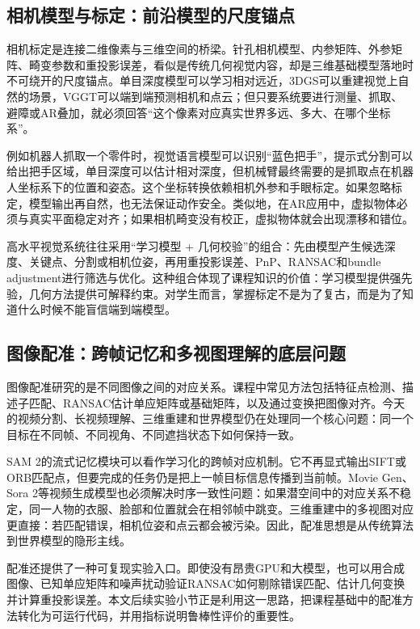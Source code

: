 \documentclass[UTF8,a4paper,12pt]{ctexart}
\newcommand{\model}[1]{\textsf{#1}}
\begin{document}
\subsection{相机模型与标定：前沿模型的尺度锚点}
相机标定是连接二维像素与三维空间的桥梁。针孔相机模型、内参矩阵、外参矩阵、畸变参数和重投影误差，看似是传统几何视觉内容，却是三维基础模型落地时不可绕开的尺度锚点。单目深度模型可以学习相对远近，3DGS可以重建视觉上自然的场景，VGGT可以端到端预测相机和点云；但只要系统要进行测量、抓取、避障或AR叠加，就必须回答“这个像素对应真实世界多远、多大、在哪个坐标系”。

例如机器人抓取一个零件时，视觉语言模型可以识别“蓝色把手”，提示式分割可以给出把手区域，单目深度可以估计相对深度，但机械臂最终需要的是抓取点在机器人坐标系下的位置和姿态。这个坐标转换依赖相机外参和手眼标定。如果忽略标定，模型输出再自然，也无法保证动作安全。类似地，在AR应用中，虚拟物体必须与真实平面稳定对齐；如果相机畸变没有校正，虚拟物体就会出现漂移和错位。

高水平视觉系统往往采用“学习模型 + 几何校验”的组合：先由模型产生候选深度、关键点、分割或相机位姿，再用重投影误差、PnP、RANSAC和bundle adjustment进行筛选与优化。这种组合体现了课程知识的价值：学习模型提供强先验，几何方法提供可解释约束。对学生而言，掌握标定不是为了复古，而是为了知道什么时候不能盲信端到端模型。

\subsection{图像配准：跨帧记忆和多视图理解的底层问题}
图像配准研究的是不同图像之间的对应关系。课程中常见方法包括特征点检测、描述子匹配、RANSAC估计单应矩阵或基础矩阵，以及通过变换把图像对齐。今天的视频分割、长视频理解、三维重建和世界模型仍在处理同一个核心问题：同一个目标在不同帧、不同视角、不同遮挡状态下如何保持一致。

\model{SAM 2}的流式记忆模块可以看作学习化的跨帧对应机制。它不再显式输出SIFT或ORB匹配点，但要完成的任务仍是把上一帧目标信息传播到当前帧。\model{Movie Gen}、\model{Sora 2}等视频生成模型也必须解决时序一致性问题：如果潜空间中的对应关系不稳定，同一人物的衣服、脸部和位置就会在相邻帧中跳变。三维重建中的多视图对应更直接：若匹配错误，相机位姿和点云都会被污染。因此，配准思想是从传统算法到世界模型的隐形主线。

配准还提供了一种可复现实验入口。即使没有昂贵GPU和大模型，也可以用合成图像、已知单应矩阵和噪声扰动验证RANSAC如何剔除错误匹配、估计几何变换并计算重投影误差。本文后续实验小节正是利用这一思路，把课程基础中的配准方法转化为可运行代码，并用指标说明鲁棒性评价的重要性。
\end{document}
